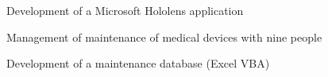 \begin{tightemize}
\item Development of a Microsoft Hololens application
\end{tightemize}
\sectionsep

\begin{tightemize}
\item Management of maintenance of medical devices with nine people
\item Development of a maintenance database (Excel VBA)
\end{tightemize}
\sectionsep

\vspace{3mm}
